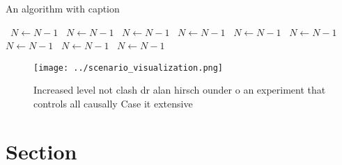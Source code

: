 \documentclass[a4paper]{article}
\begin{document}
\begin{algorithm}
\caption{An algorithm with caption}
\begin{algorithmic}
\    \State $N \gets N - 1$
\    \State $N \gets N - 1$
\    \State $N \gets N - 1$
\    \State $N \gets N - 1$
\    \State $N \gets N - 1$
\    \State $N \gets N - 1$
\    \State $N \gets N - 1$
\    \State $N \gets N - 1$
\    \State $N \gets N - 1$
\EndWhile
\end{algorithmic}
\end{algorithm}

\begin{figure}
\centering
\texttt{[image: ../scenario\_visualization.png]}
\caption{Increased level not clash dr alan hirsch ounder o an experiment that controls all causally Case it extensive 
}
\end{figure}
 
\section{Section}
\end{document}
